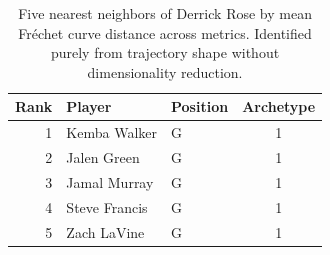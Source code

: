 \begin{table}[htbp]
  \centering\small
  \begin{tabular}{rllc}
    \toprule
    Rank & Player & Position & Archetype \\
    \midrule
    1 & Kemba Walker & G & 1 \\
    2 & Jalen Green & G & 1 \\
    3 & Jamal Murray & G & 1 \\
    4 & Steve Francis & G & 1 \\
    5 & Zach LaVine & G & 1 \\
    \bottomrule
  \end{tabular}
  \caption{Five nearest neighbors of Derrick Rose by mean Fr\'{e}chet curve distance across metrics. Identified purely from trajectory shape without dimensionality reduction.}
  \label{tab:Derrick_Rose_frechet_curve_neighbors}
\end{table}

